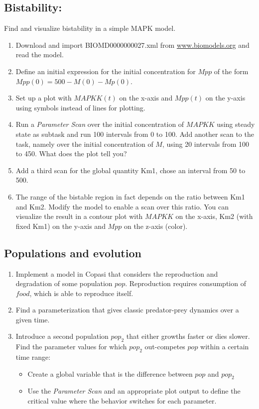 \documentclass[a4paper,11pt,twoside]{article}
\begin{document}
\subsection{Bistability:} Find and visualize bistability in a simple MAPK model.
 \begin{enumerate}
 \item Download and import BIOMD0000000027.xml from \url{www.biomodels.org} and read the model.
 \item Define an initial expression for the initial concentration for $Mpp$ of the form\\
 $Mpp(0) = 500-M(0)-Mp(0)$.
 \item Set up a plot with $MAPKK(t)$ on the x-axis and $Mpp(t)$ on the y-axis using symbols instead of lines for plotting.
 \item Run a \textit{Parameter Scan} over the initial concentration of $MAPKK$ using steady state as subtask and run 100 intervals from 0 to 100. Add another scan to the task, namely over the initial concentration of $M$, using 20 intervals from 100 to 450. What does the plot tell you?
 \item Add a third scan for the global quantity Km1, chose an interval from 50 to 500.
 \item The range of the bistable region in fact depends on the ratio between Km1 and Km2. Modify the model to enable a scan over this ratio. You can visualize the result in a contour plot with $MAPKK$ on the x-axis, Km2 (with fixed Km1) on the y-axis and $Mpp$ on the z-axis (color).
 
 \end{enumerate}
 

\subsection{Populations and evolution}
\begin{enumerate}
 \item Implement a model in Copasi  that considers the reproduction and degradation of some population $pop$. Reproduction requires consumption of $food$, which is able to reproduce itself.
 \item Find a parameterization that gives classic predator-prey dynamics over a given time.
 \item Introduce a second population $pop_2$ that either growths faster or dies slower. Find the parameter values for which $pop_2$ out-competes $pop$ within a certain time range:
  \begin{itemize}
    \item Create a global variable that is the difference between $pop$ and $pop_2$
    \item Use the \textit{Parameter Scan} and an appropriate plot output to define the critical value where the behavior switches for each parameter.
 \end{itemize}
\end{enumerate}
\end{document}

